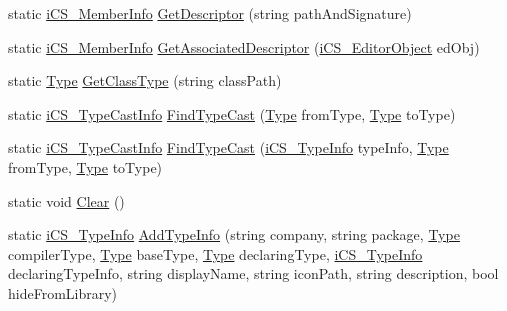 \begin{DoxyCompactItemize}
\item 
static \hyperlink{classi_c_s___member_info}{i\+C\+S\+\_\+\+Member\+Info} \hyperlink{classi_c_s___library_database_a5a8335a962f136dc82937fc1dffd2203}{Get\+Descriptor} (string path\+And\+Signature)
\item 
static \hyperlink{classi_c_s___member_info}{i\+C\+S\+\_\+\+Member\+Info} \hyperlink{classi_c_s___library_database_a691bd5afd93bc91c004327d67afa5d41}{Get\+Associated\+Descriptor} (\hyperlink{classi_c_s___editor_object}{i\+C\+S\+\_\+\+Editor\+Object} ed\+Obj)
\item 
static \hyperlink{i_c_s___object_type_enum_8cs_ae6c3dd6d8597380b56d94908eb431547aa1fa27779242b4902f7ae3bdd5c6d508}{Type} \hyperlink{classi_c_s___library_database_a190a983de1b353e2e8b1c15f5700b19c}{Get\+Class\+Type} (string class\+Path)
\item 
static \hyperlink{classi_c_s___type_cast_info}{i\+C\+S\+\_\+\+Type\+Cast\+Info} \hyperlink{classi_c_s___library_database_a89a8f97f78ec5da5608ee0c80ab4ef35}{Find\+Type\+Cast} (\hyperlink{i_c_s___object_type_enum_8cs_ae6c3dd6d8597380b56d94908eb431547aa1fa27779242b4902f7ae3bdd5c6d508}{Type} from\+Type, \hyperlink{i_c_s___object_type_enum_8cs_ae6c3dd6d8597380b56d94908eb431547aa1fa27779242b4902f7ae3bdd5c6d508}{Type} to\+Type)
\item 
static \hyperlink{classi_c_s___type_cast_info}{i\+C\+S\+\_\+\+Type\+Cast\+Info} \hyperlink{classi_c_s___library_database_a079aa5131b1f2d4fff323e2dbce689a1}{Find\+Type\+Cast} (\hyperlink{classi_c_s___type_info}{i\+C\+S\+\_\+\+Type\+Info} type\+Info, \hyperlink{i_c_s___object_type_enum_8cs_ae6c3dd6d8597380b56d94908eb431547aa1fa27779242b4902f7ae3bdd5c6d508}{Type} from\+Type, \hyperlink{i_c_s___object_type_enum_8cs_ae6c3dd6d8597380b56d94908eb431547aa1fa27779242b4902f7ae3bdd5c6d508}{Type} to\+Type)
\item 
static void \hyperlink{classi_c_s___library_database_acccc2464d99cead0db9b3ae39eac1f4f}{Clear} ()
\item 
static \hyperlink{classi_c_s___type_info}{i\+C\+S\+\_\+\+Type\+Info} \hyperlink{classi_c_s___library_database_ae1ebf7e52e78279f724312d34dfe2b5b}{Add\+Type\+Info} (string company, string package, \hyperlink{i_c_s___object_type_enum_8cs_ae6c3dd6d8597380b56d94908eb431547aa1fa27779242b4902f7ae3bdd5c6d508}{Type} compiler\+Type, \hyperlink{i_c_s___object_type_enum_8cs_ae6c3dd6d8597380b56d94908eb431547aa1fa27779242b4902f7ae3bdd5c6d508}{Type} base\+Type, \hyperlink{i_c_s___object_type_enum_8cs_ae6c3dd6d8597380b56d94908eb431547aa1fa27779242b4902f7ae3bdd5c6d508}{Type} declaring\+Type, \hyperlink{classi_c_s___type_info}{i\+C\+S\+\_\+\+Type\+Info} declaring\+Type\+Info, string display\+Name, string icon\+Path, string description, bool hide\+From\+Library)

\end{DoxyCompactItemize}
